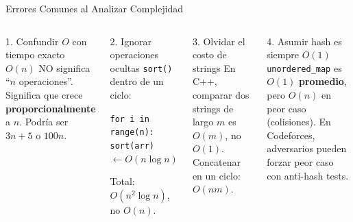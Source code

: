 \documentclass[aspectratio=169]{beamer}
\begin{document}
\begin{frame}{Errores Comunes al Analizar Complejidad}
    \begin{columns}[t]
        \begin{alertblock}{1. Confundir $O$ con tiempo exacto}
            $O(n)$ NO significa ``$n$ operaciones''. Significa que crece \textbf{proporcionalmente} a $n$. Podría ser $3n + 5$ o $100n$.
        \end{alertblock}
        
        \begin{alertblock}{2. Ignorar operaciones ocultas}
            \texttt{sort()} dentro de un ciclo:
            
            \vspace{0.1cm}
            \texttt{for i in range(n):}\\
            \quad \texttt{sort(arr)} \quad $\leftarrow O(n \log n)$
            
            \vspace{0.1cm}
            Total: $O(n^2 \log n)$, no $O(n)$.
        \end{alertblock}
        
        \begin{alertblock}{3. Olvidar el costo de strings}
            En C++, comparar dos strings de largo $m$ es $O(m)$, no $O(1)$. Concatenar en un ciclo: $O(nm)$.
        \end{alertblock}
        
        \begin{alertblock}{4. Asumir hash es siempre $O(1)$}
            \texttt{unordered\_map} es $O(1)$ \textbf{promedio}, pero $O(n)$ en peor caso (colisiones). En Codeforces, adversarios pueden forzar peor caso con anti-hash tests.
        \end{alertblock}
    \end{columns}
\end{frame}
\end{document}
